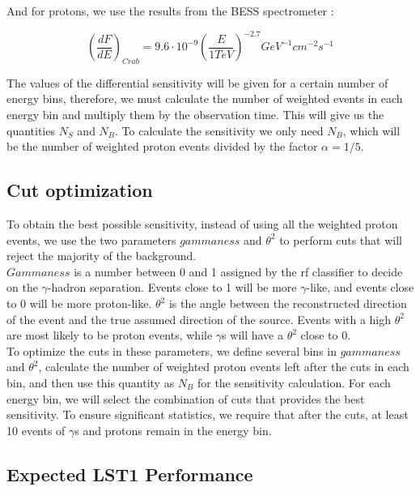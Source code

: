 \documentclass[main.tex]{subfiles}
\begin{document}
And for protons, we use the results from the BESS spectrometer \cite{2000protonBESS}:

\begin{equation}
  \left(\frac{dF}{dE}\right)_{Crab} = 9.6\cdot 10^{-9} \left(\frac{E}{1 TeV}\right)^{-2.7} GeV^{-1}cm^{-2}s^{-1}
\end{equation}

The values of the differential sensitivity will be given for a certain number of energy bins, therefore, we must calculate the number of weighted events in each energy bin and multiply them by the observation time. This will give us the quantities $N_{S}$ and $N_{B}$. To calculate the sensitivity we only need $N_{B}$, which will be the number of weighted proton events divided by the factor $\alpha = 1/5$.

\subsection{Cut optimization}

To obtain the best possible sensitivity, instead of using all the weighted proton events, we use the two parameters $gammaness$ and $\theta^2$ to perform cuts that will reject the majority of the background.\\
$Gammaness$ is a number between 0 and 1 assigned by the \gls{rf} classifier to decide on the $\gamma$-hadron separation. Events close to 1 will be more $\gamma$-like, and events close to 0 will be more proton-like.
$\theta^2$ is the angle between the reconstructed direction of the event and the true assumed direction of the source. Events with a high $\theta^2$ are most likely to be proton events, while $\gamma$s will have a $\theta^2$ close to 0.\\
To optimize the cuts in these parameters, we define several bins in $gammaness$ and $\theta^2$, calculate the number of weighted proton events left after the cuts in each bin, and then use this quantity as $N_{B}$ for the sensitivity calculation. For each energy bin, we will select the combination of cuts that provides the best sensitivity. To ensure significant statistics, we require that after the cuts, at least 10 events of $\gamma$s and protons remain in the energy bin.

\subsection{Expected LST1 Performance}\label{sec:performance}
\end{document}
